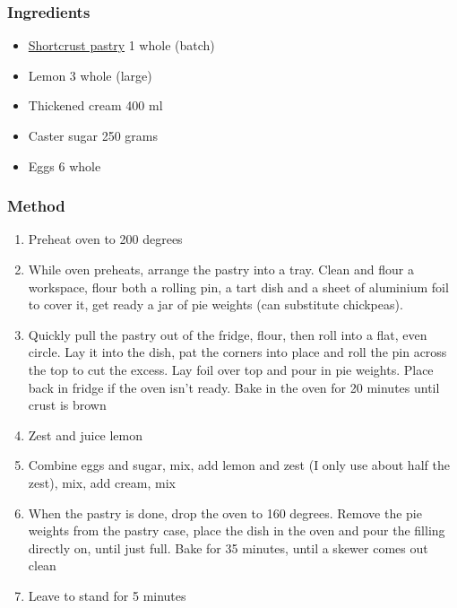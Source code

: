 \documentclass[]{article}
\begin{document}
\subsubsection*{\Large Ingredients}
\begin{multicols}{2}
\begin{itemize}
 \item \hyperref[rec:Shortcrust Pastry]{Shortcrust pastry} \hfill 1 whole (batch)
 \item Lemon \hfill 3 whole (large)
 \item Thickened cream \hfill 400 ml
 \item Caster sugar \hfill 250 grams
 \item Eggs \hfill 6 whole
\end{itemize}
\end{multicols}
\subsubsection*{\Large Method}
\begin{enumerate}[font=\huge\color{accent}]
	\item Preheat oven to 200 degrees
	\item While oven preheats, arrange the pastry into a tray. Clean and flour a workspace, flour both a rolling pin, a tart dish and a sheet of aluminium foil to cover it, get ready a jar of pie weights (can substitute chickpeas).
	\item Quickly pull the pastry out of the fridge, flour, then roll into a flat, even circle. Lay it into the dish, pat the corners into place and roll the pin across the top to cut the excess. Lay foil over top and pour in pie weights.  Place back in fridge if the oven isn’t ready. Bake in the oven for 20 minutes until crust is brown
	\item Zest and juice lemon
	\item Combine eggs and sugar, mix, add lemon and zest (I only use about half the zest), mix, add cream, mix
	\item When the pastry is done, drop the oven to 160 degrees. Remove the pie weights from the pastry case, place the dish in the oven and pour the filling directly on, until just full. Bake for 35 minutes, until a skewer comes out clean
	\item Leave to stand for 5 minutes
\end{enumerate}
\newpage
{}\label{rec:Strawberry Flan}
\end{document}
